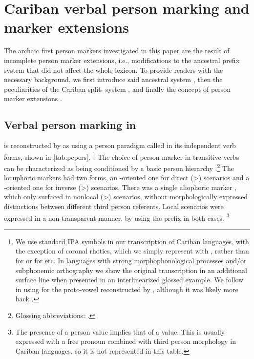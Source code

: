 \section{Cariban verbal person marking and marker extensions}
The archaic first person markers investigated in this paper are the result of incomplete person marker extensions, i.e., modifications to the ancestral prefix system that did not affect the whole lexicon.
To provide readers with the necessary background, we first introduce said ancestral system , then the peculiarities of the Cariban split- system , and finally the concept of person marker extensions .

\subsection{Verbal person marking in \PC}
\label{sec:pc_person}
\PC is reconstructed by \textcite{gildea1998} as using a person paradigm called \setone in its independent verb forms, shown in \cref{tab:pcpers}.%
\footnote{We use standard IPA symbols in our transcription of Cariban languages, with the exception of coronal rhotics, which we simply represent with , rather than  for \wayana or  for \maqui etc.
In languages with strong morphophonological processes and/or subphonemic orthography we show the original transcription in an additional surface line when presented in an interlinearized glossed example.
We follow \textcite{gildea2018reconstructing} in using  for the proto-vowel reconstructed by \textcite{meira2005southern}, although it was likely more back \parencite{gildea2010story}.}
The choice of person marker in transitive verbs can be characterized as being conditioned by a basic person hierarchy .\footnote{Glossing abbreviations: \glossingAbbrevsComma.}
The locuphoric markers had two forms, an -oriented one for direct (>) scenarios and a -oriented one for inverse (>) scenarios.
There was a single aliophoric marker , which only surfaced in nonlocal (>) scenarios, without morphologically expressed distinctions between different third person referents.
Local scenarios were expressed in a non-transparent manner, by using the  prefix  in both cases.%
\footnote{The presence of a  person value implies that of a  value.
This is usually expressed with a free pronoun combined with third person morphology in Cariban languages, so it is not represented in this table.}

